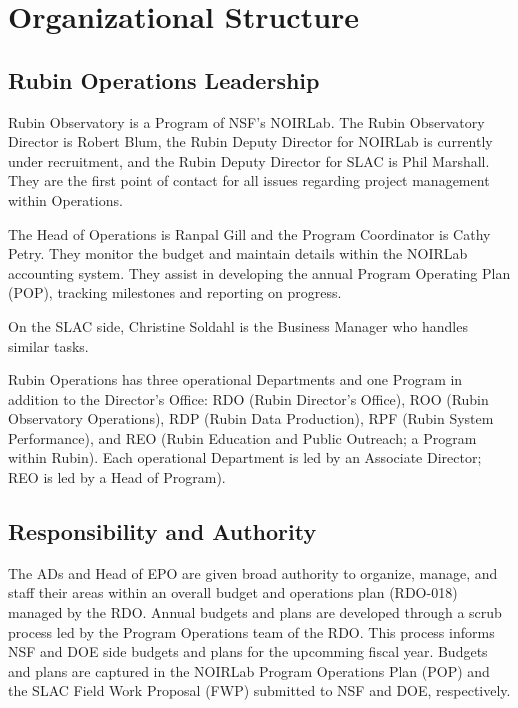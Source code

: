 \section{Organizational Structure}
\label{sec:structure}

\subsection{Rubin \gls{Operations} Leadership}
\label{sec:contacts}

Rubin Observatory is a Program of \gls{NSF}'s \gls{NOIRLab}.
The Rubin Observatory \gls{Director} is Robert Blum, the Rubin Deputy \gls{Director} for \gls{NOIRLab} is currently under recruitment, and the Rubin Deputy \gls{Director} for \gls{SLAC} is Phil Marshall.
They are the first point of contact for all issues regarding project management within \RO \gls{Operations}.

The Head of \gls{Operations} is Ranpal Gill and the Program Coordinator is Cathy Petry.
They monitor the budget and maintain details within the \gls{NOIRLab} accounting system.
They assist in developing the annual Program Operating Plan (\gls{POP}), tracking milestones and reporting on progress.

On the \gls{SLAC} side, Christine Soldahl is the \gls{Business Manager} who handles similar tasks.

Rubin Operations has three operational Departments and one Program in addition to the Director’s Office: RDO (Rubin Director’s Office), ROO (Rubin Observatory Operations), RDP (Rubin Data Production), RPF (Rubin System Performance), and REO (Rubin Education and Public Outreach; a Program within Rubin). Each operational Department is led by an Associate Director; REO is led by a Head of Program).

\subsection{Responsibility and Authority}
The ADs and Head of EPO are given broad authority to organize, manage, and staff their areas within an overall budget and operations plan (RDO-018) managed by the RDO. Annual budgets and plans are developed through a scrub process led by the Program Operations team of the RDO. This process informs NSF and DOE side budgets and plans for the upcomming fiscal year. Budgets and plans are captured in the NOIRLab Program Operations Plan (POP) and the SLAC Field Work Proposal (FWP) submitted to NSF and DOE, respectively.

